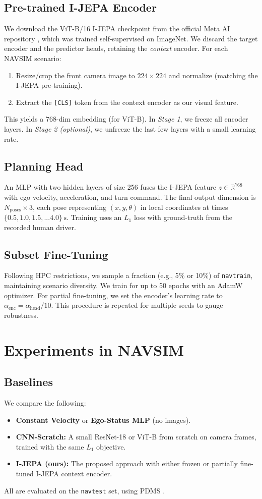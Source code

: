 \documentclass{article}
\begin{document}
\subsection{Pre-trained I-JEPA Encoder}
We download the ViT-B/16 I-JEPA checkpoint from the official Meta AI repository \cite{assran2023ijepa}, which was trained self-supervised on ImageNet. We discard the target encoder and the predictor heads, retaining the \emph{context} encoder. For each NAVSIM scenario:
\begin{enumerate}
    \item Resize/crop the front camera image to $224\times224$ and normalize (matching the I-JEPA pre-training).
    \item Extract the \texttt{[CLS]} token from the context encoder as our visual feature.
\end{enumerate}
This yields a 768-dim embedding (for ViT-B). In \emph{Stage 1}, we freeze all encoder layers. In \emph{Stage 2 (optional)}, we unfreeze the last few layers with a small learning rate.

\subsection{Planning Head}
An MLP with two hidden layers of size 256 fuses the I-JEPA feature $z \in \mathbb{R}^{768}$ with ego velocity, acceleration, and turn command. The final output dimension is $N_{\text{poses}} \times 3$, each pose representing $(x, y, \theta)$ in local coordinates at times $\{0.5, 1.0, 1.5, ...4.0\}\,\text{s}$. Training uses an $L_1$ loss with ground-truth from the recorded human driver.

\subsection{Subset Fine-Tuning}
Following HPC restrictions, we sample a fraction (e.g., 5\% or 10\%) of \texttt{navtrain}, maintaining scenario diversity. We train for up to 50 epochs with an AdamW optimizer. For partial fine-tuning, we set the encoder’s learning rate to $\alpha_{\text{enc}}=\alpha_{\text{head}} / 10$. This procedure is repeated for multiple seeds to gauge robustness.

\section{Experiments in NAVSIM}
\subsection{Baselines}
We compare the following:
\begin{itemize}
    \item \textbf{Constant Velocity} or \textbf{Ego-Status MLP} (no images).
    \item \textbf{CNN-Scratch:} A small ResNet-18 or ViT-B from scratch on camera frames, trained with the same $L_1$ objective.
    \item \textbf{I-JEPA (ours):} The proposed approach with either frozen or partially fine-tuned I-JEPA context encoder.
\end{itemize}
All are evaluated on the \texttt{navtest} set, using PDMS \cite{dauner2024navsim}.
\end{document}
